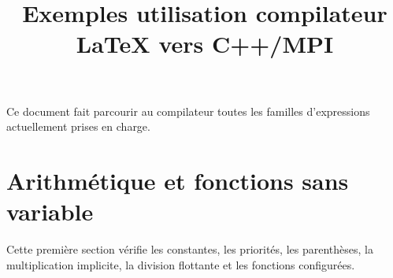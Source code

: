 \documentclass[10pt,conference]{IEEEtran}
\begin{document}
\title{Exemples utilisation compilateur LaTeX vers C++/MPI}
\maketitle

Ce document fait parcourir au compilateur toutes les familles d'expressions
actuellement prises en charge.


\section{Arithmétique et fonctions sans variable}

Cette première section vérifie les constantes, les priorités, les parenthèses,
la multiplication implicite, la division flottante et les fonctions
configurées.
\end{document}
